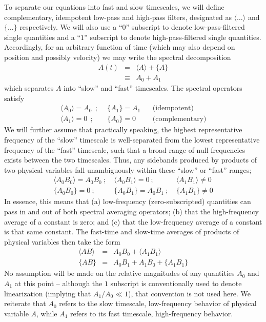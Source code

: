 To separate our equations into fast and slow timescales, we will define complementary, idempotent low-pass
and high-pass filters, designated as $\langle \ldots \rangle$ and $\{ \ldots \}$ respectively.
We will also use a ``$0$'' subscript to denote low-pass-filtered single quantities and a ``$1$'' subscript to
denote high-pass-filtered single quantities.  Accordingly, for an arbitrary function of time (which may
also depend on position and possibly velocity) we may write the spectral decomposition
\begin{eqnarray}
A(t) & = & \langle A \rangle + \{ A \} \nonumber \\
     & \equiv & A_{0} + A_{1} 
\end{eqnarray}
which separates $A$ into ``slow'' and ``fast'' timescales.  The spectral operators satisfy
\begin{eqnarray}
\langle A_{0} \rangle = A_{0} ~~;&~~ \{ A_{1} \} = A_{1} ~~&~~ \mbox{(idempotent)} \label{i1} \\
\langle A_{1} \rangle = 0 ~~;&~~ \{ A_{0} \} = 0 ~~&~~ \mbox{(complementary)} \label{i2}
\end{eqnarray} 
We will further assume that practically speaking, the highest representative frequency of the ``slow''
timescale is well-separated from the lowest representative frequency of the ``fast'' timescale, such
that a broad range of null frequencies exists between the two timescales.  Thus,
any sidebands produced by products of two physical variables fall unambiguously within these ``slow'' or ``fast''
ranges;
\begin{eqnarray}
\langle A_{0} B_{0} \rangle = A_{0} B_{0} ~;~&
\langle A_{0} B_{1} \rangle = 0 ~;~&
\langle A_{1} B_{1} \rangle \neq 0 \\
\{ A_{0} B_{0} \} = 0 ~;~&
\{ A_{0} B_{1} \} = A_{0} B_{1} ~;~&
\{ A_{1} B_{1} \} \neq 0
\end{eqnarray}
In essence, this means that (a) low-frequency (zero-subscripted) quantities can pass in and out of
both spectral averaging operators; (b) that the high-frequency average of a constant is zero; and
(c) that the low-frequency average of a constant is that same constant.
The fast-time and slow-time averages of products of physical variables then take the form 
\begin{eqnarray}
\langle A B \rangle & = & A_{0} B_{0} + \langle A_{1} B_{1} \rangle \label{slowprod} \\
\{ A B \} & = & A_{0} B_{1} + A_{1} B_{0} + \{ A_{1} B_{1} \} \label{fastprod}
\end{eqnarray}
No assumption will be made on the relative magnitudes of any quantities $A_{0}$ and $A_{1}$
at this point -- although the $1$ subscript is conventionally used to denote linearization
(implying that $A_{1}/A_{0} \ll 1$), that convention is not used here.  We reiterate that 
$A_{0}$ refers to the slow timescale, low-frequency behavior of physical variable $A$,  while 
$A_{1}$ refers to its fast timescale, high-frequency behavior.

